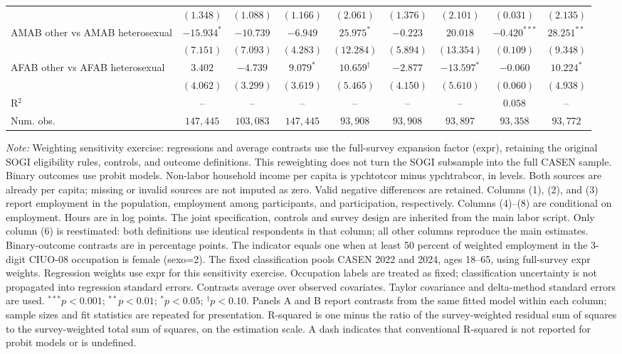 \begin{table}[htpb!]
{\begin{tabular}{l c c c c c c c c}
 & $(1.348)$ & $(1.088)$ & $(1.166)$ & $(2.061)$ & $(1.376)$ & $(2.101)$ & $(0.031)$ & $(2.135)$ \\
AMAB other vs AMAB heterosexual & $-15.934^{*}$ & $-10.739$ & $-6.949$ & $25.975^{*}$ & $-0.223$ & $20.018$ & $-0.420^{***}$ & $28.251^{**}$ \\
 & $(7.151)$ & $(7.093)$ & $(4.283)$ & $(12.284)$ & $(5.894)$ & $(13.354)$ & $(0.109)$ & $(9.348)$ \\
AFAB other vs AFAB heterosexual & $3.402$ & $-4.739$ & $9.079^{*}$ & $10.659^{\dagger}$ & $-2.877$ & $-13.597^{*}$ & $-0.060$ & $10.224^{*}$ \\
 & $(4.062)$ & $(3.299)$ & $(3.619)$ & $(5.465)$ & $(4.150)$ & $(5.610)$ & $(0.060)$ & $(4.938)$ \\
\hline
R$^2$ & -- & -- & -- & -- & -- & -- & $0.058$ & -- \\
Num. obs. & $147,445$ & $103,083$ & $147,445$ & $93,908$ & $93,908$ & $93,897$ & $93,358$ & $93,772$ \\
\hline
\end{tabular}%
}
\par\vspace{1ex}
\begin{minipage}{\textwidth}\footnotesize\raggedright
\textit{Note:} Weighting sensitivity exercise: regressions and average contrasts use the full-survey expansion factor (expr), retaining the original SOGI eligibility rules, controls, and outcome definitions. This reweighting does not turn the SOGI subsample into the full CASEN sample. Binary outcomes use probit models. Non-labor household income per capita is ypchtotcor minus ypchtrabcor, in levels. Both sources are already per capita; missing or invalid sources are not imputed as zero. Valid negative differences are retained. Columns (1), (2), and (3) report employment in the population, employment among participants, and participation, respectively. Columns (4)--(8) are conditional on employment. Hours are in log points. The joint specification, controls and survey design are inherited from the main labor script. Only column (6) is reestimated: both definitions use identical respondents in that column; all other columns reproduce the main estimates. Binary-outcome contrasts are in percentage points. The indicator equals one when at least 50 percent of weighted employment in the 3-digit CIUO-08 occupation is female (sexo=2). The fixed classification pools CASEN 2022 and 2024, ages 18--65, using full-survey expr weights. Regression weights use expr for this sensitivity exercise. Occupation labels are treated as fixed; classification uncertainty is not propagated into regression standard errors. Contrasts average over observed covariates. Taylor covariance and delta-method standard errors are used. $^{***}p<0.001$; $^{**}p<0.01$; $^{*}p<0.05$; $^{\dagger}p<0.10$. Panels A and B report contrasts from the same fitted model within each column; sample sizes and fit statistics are repeated for presentation. R-squared is one minus the ratio of the survey-weighted residual sum of squares to the survey-weighted total sum of squares, on the estimation scale. A dash indicates that conventional R-squared is not reported for probit models or is undefined.

\end{minipage}
\end{table}
